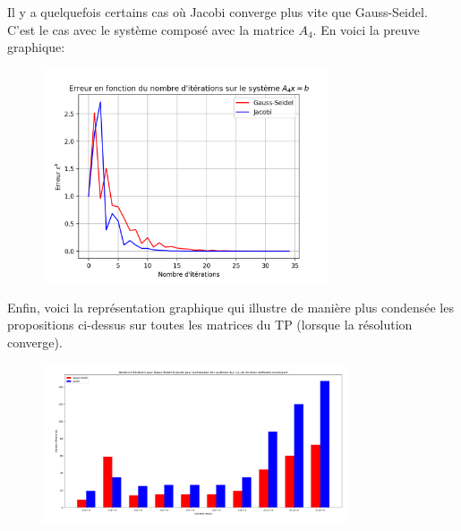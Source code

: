 Il y a quelquefois certains cas où Jacobi converge plus vite que Gauss-Seidel. C'est le cas avec le système composé avec la matrice $A_4$.
En voici la preuve graphique:
\begin{figure}[H]
    \centering
    \includegraphics[width=0.75\textwidth]{graphes/graphs/resA4.png}
\end{figure}

Enfin, voici la représentation graphique qui illustre de manière plus condensée les propositions ci-dessus sur toutes les matrices du TP (lorsque la résolution converge).
\begin{figure}[H]
    \centering
    \includegraphics[angle=90, width=0.8\textwidth]{graphes/graphs/baton.png}
\end{figure}
% 

